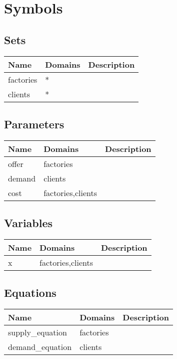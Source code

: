 \documentclass[11pt]{article}
\begin{document}
\section*{Symbols}


\subsection*{Sets}
\begin{tabularx}{\textwidth}{| l | l | X |}
\hline
\textbf{Name} & \textbf{Domains} & \textbf{Description}\\
\hline
\endhead

factories & * & \\
clients & * & \\
\hline
\end{tabularx}
\subsection*{Parameters}
\begin{tabularx}{\textwidth}{| l | l | X |}
\hline
\textbf{Name} & \textbf{Domains} & \textbf{Description}\\
\hline
\endhead

offer & factories & \\
demand & clients & \\
cost & factories,clients & \\
\hline
\end{tabularx}
\subsection*{Variables}
\begin{tabularx}{\textwidth}{| l | l | X |}
\hline
\textbf{Name} & \textbf{Domains} & \textbf{Description}\\
\hline
\endhead

x & factories,clients & \\
\hline
\end{tabularx}
\subsection*{Equations}
\begin{tabularx}{\textwidth}{| l | l | X |}
\hline
\textbf{Name} & \textbf{Domains} & \textbf{Description}\\
\hline
\endhead

supply\_equation & factories & \\
demand\_equation & clients & \\
\hline
\end{tabularx}
\end{document}
